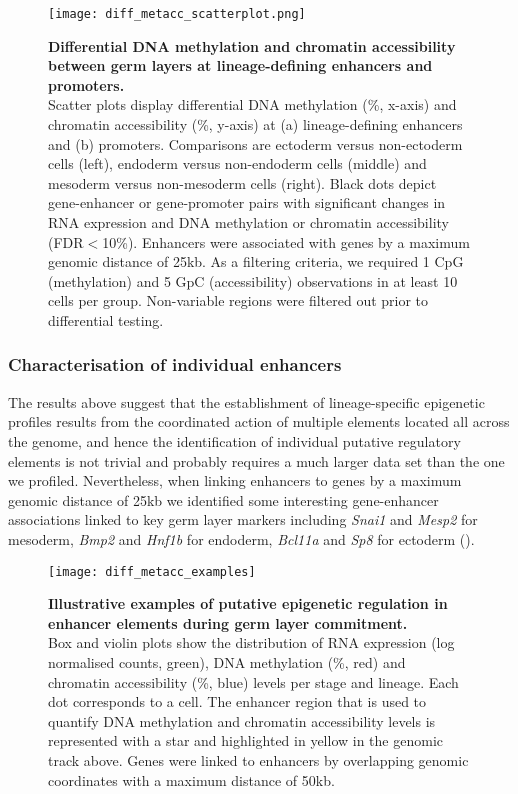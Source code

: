 \begin{figure}[H]
	\centering
	\texttt{[image: diff\_metacc\_scatterplot.png]}
	\caption[]{
	\textbf{Differential DNA methylation and chromatin accessibility between germ layers at lineage-defining enhancers and promoters.} \\
	Scatter plots display differential DNA methylation (\%, x-axis) and chromatin accessibility (\%, y-axis) at (a) lineage-defining enhancers and (b) promoters. Comparisons are ectoderm versus non-ectoderm cells (left), endoderm versus non-endoderm cells (middle) and mesoderm versus non-mesoderm cells (right). Black dots depict gene-enhancer or gene-promoter pairs with significant changes in RNA expression and DNA methylation or chromatin accessibility (FDR$<$10\%). Enhancers were associated with genes by a maximum genomic distance of 25kb. As a filtering criteria, we required 1 CpG (methylation) and 5 GpC (accessibility) observations in at least 10 cells per group. Non-variable regions were filtered out prior to differential testing.
	}
	\label{fig:diff_metacc_scatterplot}
\end{figure}

\subsubsection{Characterisation of individual enhancers}

The results above suggest that the establishment of lineage-specific epigenetic profiles results from the coordinated action of multiple elements located all across the genome, and hence the identification of individual putative regulatory elements is not trivial and probably requires a much larger data set than the one we profiled. Nevertheless, when linking enhancers to genes by a maximum genomic distance of 25kb we identified some interesting gene-enhancer associations linked to key germ layer markers including \textit{Snai1} and \textit{Mesp2} for mesoderm, \textit{Bmp2} and \textit{Hnf1b} for endoderm, \textit{Bcl11a} and \textit{Sp8} for ectoderm ().

\begin{figure}[H]
	\centering
	\texttt{[image: diff\_metacc\_examples]}
	\caption[]{
	\textbf{Illustrative examples of putative epigenetic regulation in enhancer elements during germ layer commitment.} \\
	Box and violin plots show the distribution of RNA expression (log normalised counts, green), DNA methylation (\%, red) and chromatin accessibility (\%, blue) levels per stage and lineage. Each dot corresponds to a cell. The enhancer region that is used to quantify DNA methylation and chromatin accessibility levels is represented with a star and highlighted in yellow in the genomic track above. Genes were linked to enhancers by overlapping genomic coordinates with a maximum distance of 50kb.}
	\label{fig:diff_metacc_examples}
\end{figure}


